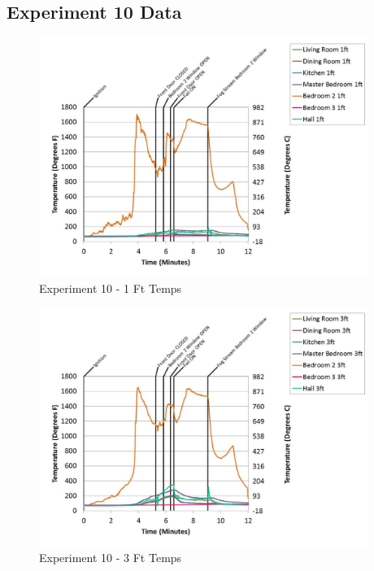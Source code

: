 \documentclass{article}
\begin{document}
\begin{appendices}
	\clearpage

		\clearpage
\clearpage		\large
\subsection{Experiment 10 Data} \label{App:Exp10Results} 

	\begin{figure}[h!]
		\centering
		\includegraphics[height=3.05in]{0_Images/Results_Charts/Exp_10_Charts/1FtTemps.pdf}
		\caption{Experiment 10 - 1 Ft Temps}
	\end{figure}
 

	\begin{figure}[h!]
		\centering
		\includegraphics[height=3.05in]{0_Images/Results_Charts/Exp_10_Charts/3FtTemps.pdf}
		\caption{Experiment 10 - 3 Ft Temps}
	\end{figure}
 
	\clearpage


\end{appendices}
\end{document}
